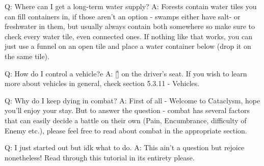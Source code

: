 \documentclass[11pt]{report}
\begin{document}
Q: Where can I get a long-term water supply?
A: Forests contain water tiles you can fill containers in, if those aren't an option - swamps either have salt- or freshwater in them, but usually always contain both somewhere so make sure to check every water tile, even connected ones. If nothing like that works, you can just use a funnel on an open tile and place a water container below (drop it on the same tile).

Q: How do I control a vehicle?e
A: [\^] on the driver's seat. If you wish to learn more about vehicles in general, check section 5.3.11 - Vehicles.

Q: Why do I keep dying in combat?
A: First of all - Welcome to Cataclysm, hope you'll enjoy your stay. But to answer the question - combat has several factors that can easily decide a battle on their own (Pain, Encumbrance, difficulty of Enemy etc.), please feel free to read about combat in the appropriate section.

Q: I just started out but idk what to do.
A: This ain't a question but rejoice nonetheless! Read through this tutorial in its entirety please.
\end{document}
